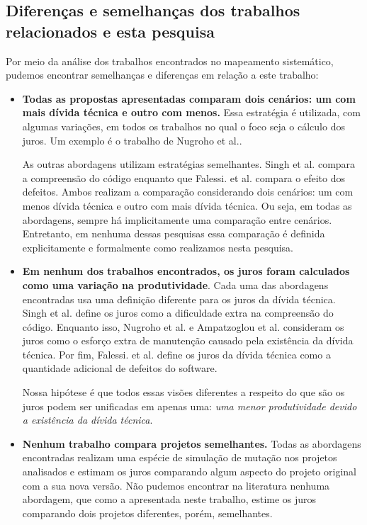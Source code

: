 \subsection{Diferenças e semelhanças dos trabalhos relacionados e esta pesquisa}


Por meio da análise dos trabalhos encontrados no mapeamento sistemático, pudemos encontrar semelhanças e diferenças em relação a este trabalho:

\begin{itemize}

\item \textbf{Todas as propostas apresentadas comparam dois cenários: um com mais dívida técnica e outro com menos.} Essa estratégia é utilizada, com algumas variações, em todos os trabalhos no qual o foco seja o cálculo dos juros. Um exemplo é o trabalho de Nugroho et al.\cite{nugroho2011empirical}. 

As outras abordagens utilizam estratégias semelhantes. Singh et al.\cite{singh2014framework} compara a compreensão do código enquanto que Falessi. et al. \cite{falessi2015towards} compara o efeito dos defeitos. Ambos realizam a comparação considerando dois cenários: um com menos dívida técnica e outro com mais dívida técnica. Ou seja, em todas as abordagens, sempre há implicitamente uma comparação entre cenários. Entretanto, em nenhuma dessas pesquisas essa comparação é definida explicitamente e formalmente como realizamos nesta pesquisa. 

\item \textbf{Em nenhum dos trabalhos encontrados, os juros foram calculados como uma variação na produtividade}. Cada uma das abordagens encontradas usa uma definição diferente para os juros da dívida técnica. Singh et al.\cite{singh2014framework} define os juros como a dificuldade extra na compreensão do código. Enquanto isso, Nugroho et al.\cite{nugroho2011empirical} e Ampatzoglou et al. \cite{ampatzoglou2015financial,ampatzoglou2018framework} consideram os juros como o esforço extra de manutenção causado pela existência da dívida técnica. Por fim, Falessi. et al. \cite{falessi2015towards} define os juros da dívida técnica como a quantidade adicional de defeitos do software. 

Nossa hipótese é que todos essas visões diferentes a respeito do que são os juros podem ser unificadas em apenas uma: \textit{uma menor produtividade devido a existência da dívida técnica}.    

\item \textbf{Nenhum trabalho compara projetos semelhantes.} Todas as abordagens encontradas realizam uma espécie de simulação de mutação nos projetos analisados e estimam os juros comparando algum aspecto do projeto original com a sua nova versão. Não pudemos encontrar na literatura nenhuma abordagem, que como a apresentada neste trabalho, estime os juros comparando dois projetos diferentes, porém, semelhantes. 


\end{itemize}
